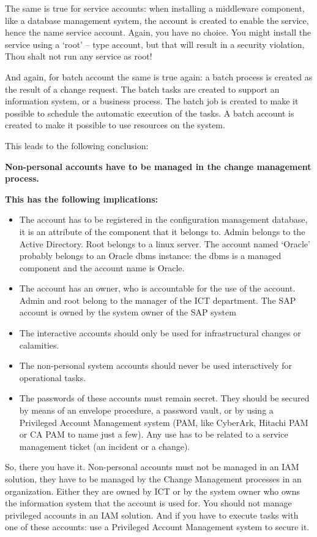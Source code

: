 The same is true for service accounts: when installing a middleware
component, like a database management system, the account is created to
enable the service, hence the name service account. Again, you have no
choice. You might install the service using a `root' -- type account,
but that will result in a security violation, Thou shalt not run any
service as root!

And again, for batch account the same is true again: a batch process is
created as the result of a change request. The batch tasks are created
to support an information system, or a business process. The batch job
is created to make it possible to schedule the automatic execution of
the tasks. A batch account is created to make it possible to use
resources on the system.

This leads to the following conclusion:

\textbf{Non-personal accounts have to be managed in the change
management process.}

\textbf{This has the following implications:}

\begin{itemize}
\tightlist
\item
  The account has to be registered in the configuration management
  database, it is an attribute of the component that it belongs to.
  Admin belongs to the Active Directory. Root belongs to a linux server.
  The account named `Oracle' probably belongs to an Oracle dbms
  instance: the dbms is a managed component and the account name is
  Oracle.
\item
  The account has an owner, who is accountable for the use of the
  account. Admin and root belong to the manager of the ICT department.
  The SAP account is owned by the system owner of the SAP system
\item
  The interactive accounts should only be used for infrastructural
  changes or calamities.
\item
  The non-personal system accounts should never be used interactively
  for operational tasks.
\item
  The passwords of these accounts must remain secret. They should be
  secured by means of an envelope procedure, a password vault, or by
  using a Privileged Account Management system (PAM, like CyberArk,
  Hitachi PAM or CA PAM to name just a few). Any use has to be related
  to a service management ticket (an incident or a change).
\end{itemize}

So, there you have it. Non-personal accounts must not be managed in an
IAM solution, they have to be managed by the Change Management processes
in an organization. Either they are owned by ICT or by the system owner
who owns the information system that the account is used for. You should
not manage privileged accounts in an IAM solution. And if you have to
execute tasks with one of these accounts: use a Privileged Account
Management system to secure it.
